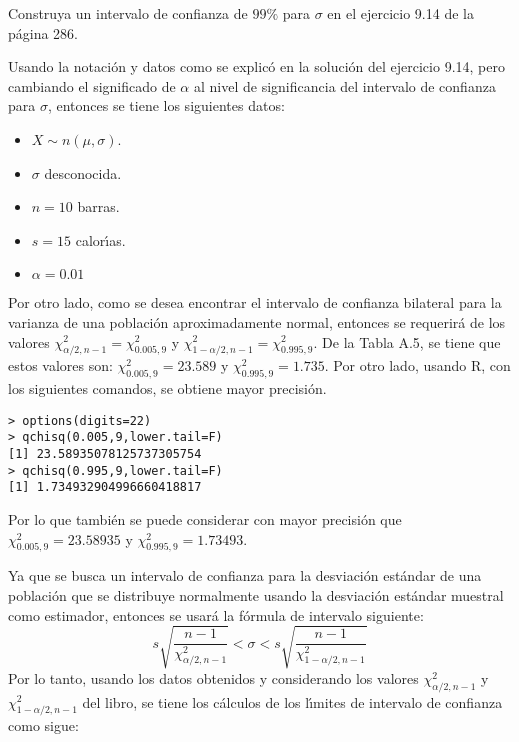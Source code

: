\begin{enunciado}
 Construya un intervalo de confianza de $99\%$ para $\sigma$ en el ejercicio 9.14 de la p\'agina 286.
\end{enunciado}

\begin{solucion}
 Usando la notaci\'on y datos como se explic\'o en la soluci\'on del ejercicio 9.14, pero cambiando el significado de $\alpha$ al nivel de significancia del intervalo de confianza para $\sigma$, entonces se tiene los siguientes datos:
 \begin{itemize}
  \item $X \sim n(\mu, \sigma)$.
  \item $\sigma$ desconocida.
  \item $n = 10$ barras.
  \item $s = 15$ calor\'{\i}as.
  \item $\alpha = 0.01$
 \end{itemize}
 Por otro lado, como se desea encontrar el intervalo de confianza bilateral para la varianza de una poblaci\'on aproximadamente normal, entonces se requerir\'a de los valores $\chi^2_{\alpha/2,n-1} = \chi^2_{0.005,9}$ y $\chi^2_{1-\alpha/2,n-1} = \chi^2_{0.995,9}$. De la Tabla A.5, se tiene que estos valores son: $\chi^2_{0.005,9} = 23.589$ y $\chi^2_{0.995,9} = 1.735$. Por otro lado, usando R, con los siguientes comandos, se obtiene mayor precisi\'on.
 \begin{verbatim}
> options(digits=22)
> qchisq(0.005,9,lower.tail=F)
[1] 23.58935078125737305754
> qchisq(0.995,9,lower.tail=F)
[1] 1.734932904996660418817
 \end{verbatim}
 \vspace{-0.5cm}
 Por lo que tambi\'en se puede considerar con mayor precisi\'on que $\chi^2_{0.005,9} = 23.58935$ y $\chi^2_{0.995,9} = 1.73493$.
 \par 
 Ya que se busca un intervalo de confianza para la desviaci\'on est\'andar de una poblaci\'on que se distribuye normalmente usando la desviaci\'on est\'andar muestral como estimador, entonces se usar\'a la f\'ormula de intervalo siguiente:
 \begin{equation*}
  s\sqrt{\frac{n-1}{\chi^2_{\alpha/2,n-1}}} < \sigma < s\sqrt{\frac{n-1}{\chi^2_{1-\alpha/2,n-1}}}
 \end{equation*}
 Por lo tanto, usando los datos obtenidos y considerando los valores $\chi^2_{\alpha/2,n-1}$ y $\chi^2_{1-\alpha/2,n-1}$ del libro, se tiene los c\'alculos de los l\'{\i}mites de intervalo de confianza como sigue:

\end{solucion}
